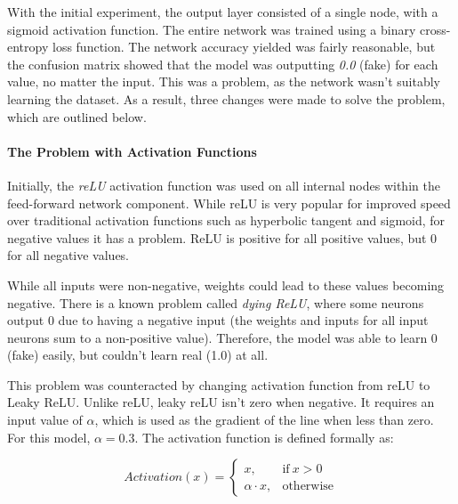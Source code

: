 \documentclass[12pt,a4paper]{article}
\begin{document}
                With the initial experiment, the output layer consisted of a single node, with a sigmoid activation function. The entire network was trained using a binary cross-entropy loss function. The network accuracy yielded was fairly reasonable,
                but the confusion matrix showed that the model was outputting \emph{0.0} (fake) for each value, no matter the input. This was a problem, as the network wasn't suitably learning the dataset. As a result, three changes were made to solve the problem, which are outlined below.
                
                \paragraph{The Problem with Activation Functions}
                Initially, the \emph{reLU} activation function was used on all internal nodes within the feed-forward network component. While reLU is very popular for improved speed over traditional activation functions such as hyperbolic tangent and sigmoid,
                for negative values it has a problem. ReLU is positive for all positive values, but 0 for all negative values.

                While all inputs were non-negative, weights could lead to these values becoming negative. There is a known problem called \emph{dying ReLU}, where some neurons output 0
                due to having a negative input (the weights and inputs for all input neurons sum to a non-positive value). Therefore, the model was able to learn 0 (fake) easily, but couldn't learn real (1.0) at all. \cite{liu_liu_2017}

                This problem was counteracted by changing activation function from reLU to Leaky ReLU. Unlike reLU, leaky reLU isn't zero when negative. It requires an input value of $\alpha$, which is used as the gradient of the line when less than zero. \cite{liu_liu_2017} For this model, $\alpha=0.3$. The activation function is defined formally as:
                
                
                \begin{equation}
                    Activation(x) =
                    \begin{cases}
                    x, & \text{if}\ x>0 \\
                    \alpha \cdot x, & \text{otherwise}
                    \end{cases}
                \end{equation}
\end{document}
